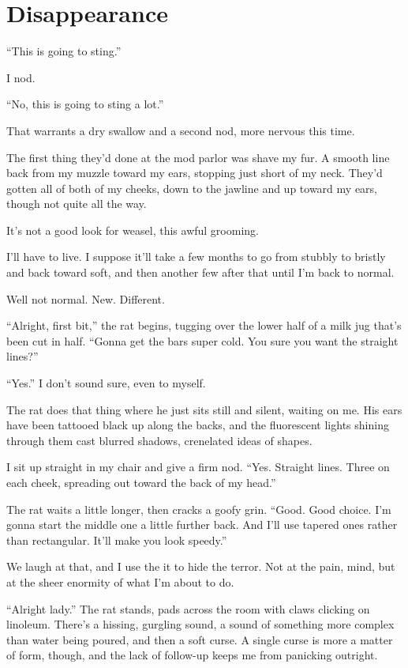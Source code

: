\chapter{Disappearance}\label{disappearance}

``This is going to sting.''

I nod.

``No, this is going to sting a lot.''

That warrants a dry swallow and a second nod, more nervous this time.

The first thing they'd done at the mod parlor was shave my fur. A smooth line back from my muzzle toward my ears, stopping just short of my neck. They'd gotten all of both of my cheeks, down to the jawline and up toward my ears, though not quite all the way.

It's not a good look for weasel, this awful grooming.

I'll have to live. I suppose it'll take a few months to go from stubbly to bristly and back toward soft, and then another few after that until I'm back to normal.

Well not normal. New. Different.

``Alright, first bit,'' the rat begins, tugging over the lower half of a milk jug that's been cut in half. ``Gonna get the bars super cold. You sure you want the straight lines?''

``Yes.'' I don't sound sure, even to myself.

The rat does that thing where he just sits still and silent, waiting on me. His ears have been tattooed black up along the backs, and the fluorescent lights shining through them cast blurred shadows, crenelated ideas of shapes.

I sit up straight in my chair and give a firm nod. ``Yes. Straight lines. Three on each cheek, spreading out toward the back of my head.''

The rat waits a little longer, then cracks a goofy grin. ``Good. Good choice. I'm gonna start the middle one a little further back. And I'll use tapered ones rather than rectangular. It'll make you look speedy.''

We laugh at that, and I use the it to hide the terror. Not at the pain, mind, but at the sheer enormity of what I'm about to do.

``Alright lady.'' The rat stands, pads across the room with claws clicking on linoleum. There's a hissing, gurgling sound, a sound of something more complex than water being poured, and then a soft curse. A single curse is more a matter of form, though, and the lack of follow-up keeps me from panicking outright.

